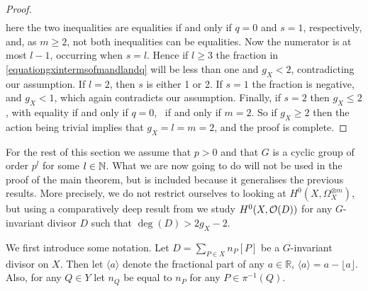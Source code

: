 \begin{proof}
\begin{align*}
        \end{align*}
    here the two inequalities are equalities if and only if $q=0$ and $s=1$, respectively, and, as $m\geq 2$, not both inequalities can be equalities.
    Now the numerator is at most $l-1$, occurring when $s=l$. 
    Hence if $l\geq 3$ the fraction in \eqref{equationgxintermsofmandlandq} will be less than one and $g_X < 2$, contradicting our assumption.
    If $l=2$, then $s$ is either 1 or 2.
    If $s=1$ the fraction is negative, and $g_X<1$, which again contradicts our assumption.
    Finally, if $s=2$ then $g_X\leq 2$, with equality if and only if $q=0$, \ie~if and only if $m=2$.
    So if $g_X \geq 2$ then the action being trivial implies that $g_X=l=m=2$, and the proof is complete.    
    \end{proof}

For the rest of this section we assume that $p>0$ and that $G$ is a cyclic group of order $p^l$ for some $l \in {\mathbb N}$.
What we are now going to do will not be used in the proof of the main theorem, but is included because it generalises the previous results.
More precisely, we do not restrict ourselves to looking at $H^0(X,\Omega_X^{\otimes m})$, but using a comparatively deep result from \cite{kako} we study $H^0(X,{\cal O}(D))$ for any $G$-invariant divisor $D$ such that $\deg(D)>2g_X-2$.


We first introduce some notation.
Let $D = \sum_{P\in X} n_P[P]$ be a $G$-invariant divisor on $X$.
Then let $\langle a \rangle$ denote the fractional part of any $a\in \mathbb{R}$, \ie $\langle a \rangle = a - \lfloor a \rfloor$.
Also, for any $Q\in Y$ let $n_Q$ be equal to $n_P$ for any $P\in \pi^{-1}(Q)$.




